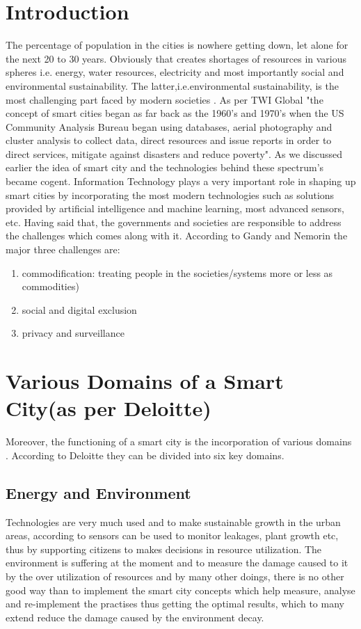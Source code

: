 \documentclass[sigconf]{acmart}
\begin{document}
\section{Introduction}
The percentage of population in the cities is nowhere getting down, let alone for the next 20 to 30 years\cite{lai2020review}. Obviously that creates shortages of resources in various spheres i.e. energy, water resources, electricity and most importantly social and environmental sustainability. The latter,i.e.environmental sustainability, is the most challenging part faced by modern societies \cite{lai2020review}. As per TWI Global \cite{twiglobal} "the concept of smart cities began as far back as the 1960's and 1970's when the US Community Analysis Bureau began using databases, aerial photography and cluster analysis to collect data, direct resources and issue reports in order to direct services, mitigate against disasters and reduce poverty". As we discussed earlier the idea of smart city and the technologies behind these spectrum's became cogent. Information Technology plays a very important role in shaping up smart cities by incorporating the most modern technologies such as solutions provided by artificial intelligence and machine learning, most advanced sensors, etc. Having said that, the governments and societies are responsible to address the challenges which comes along with it. According to Gandy and Nemorin \cite{gandy2019toward} the major three challenges are:
\begin{enumerate}
\item{commodification}: treating people in the societies/systems more or less as commodities) 
\item{social and digital exclusion} \item{privacy and surveillance}
\end{enumerate}

\section{Various Domains of a Smart City(as per Deloitte)}
	Moreover, the functioning of a smart city is the incorporation of various domains \cite{gandy2019toward}. According to Deloitte they can be divided into six key domains\cite{lai2020review}.
 \subsection{Energy and Environment}
Technologies are very much used and to make sustainable growth in the urban areas, according to \cite{fedorova2019balancing} sensors can be used to monitor leakages, plant growth etc, thus by supporting citizens to makes decisions in resource utilization. The environment is suffering at the moment and to measure the damage caused to it by the over utilization of resources and by many other doings, there is no other good way than to implement the smart city concepts which help measure, analyse and re-implement the practises thus getting the optimal results, which to many extend reduce the damage caused by the environment decay.
\end{document}
